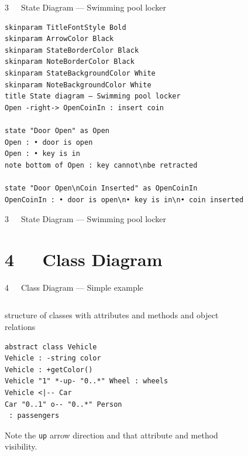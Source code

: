 \documentclass{beamer}
\begin{document}
\begin{frame}[fragile]{3~~~State Diagram — Swimming pool locker}
\begin{verbatim}
skinparam TitleFontStyle Bold
skinparam ArrowColor Black
skinparam StateBorderColor Black
skinparam NoteBorderColor Black
skinparam StateBackgroundColor White
skinparam NoteBackgroundColor White
title State diagram — Swimming pool locker
Open -right-> OpenCoinIn : insert coin

state "Door Open" as Open
Open : • door is open
Open : • key is in
note bottom of Open : key cannot\nbe retracted

state "Door Open\nCoin Inserted" as OpenCoinIn
OpenCoinIn : • door is open\n• key is in\n• coin inserted
\end{verbatim}
\end{frame}

\begin{frame}{3~~~State Diagram — Swimming pool locker}
\begin{figure}
\def\centering\svgwidth{\textwidth}
\resizebox{\textwidth}{!}{}
\end{figure}
\end{frame}



\section{4~~~Class Diagram}

\begin{frame}[fragile]{4~~~Class Diagram — Simple example}
\begin{columns}
\begin{column}{.65\textwidth}
structure of \alert{classes} with \alert{attributes} and \alert{methods} and object \alert{relations}
\begin{verbatim}
abstract class Vehicle
Vehicle : -string color
Vehicle : +getColor()
Vehicle "1" *-up- "0..*" Wheel : wheels
Vehicle <|-- Car
Car "0..1" o-- "0..*" Person
 : passengers
\end{verbatim}
Note the \texttt{up} arrow direction and that attribute and method visibility.
\end{column}
\begin{column}{.35\textwidth}
\begin{figure}
\def\centering\svgwidth{\columnwidth}
\resizebox{!}{.8\textheight}{}
\end{figure}
\end{column}
\end{columns}
\end{frame}
\end{document}
